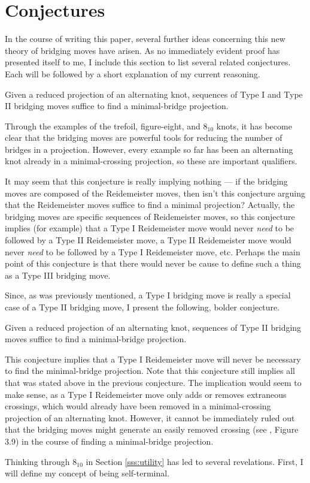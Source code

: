\documentclass[titlepage]{article}
\begin{document}
\section{Conjectures}
In the course of writing this paper, several further ideas concerning this new theory of bridging moves have arisen. As no immediately evident proof has presented itself to me, I include this section to list several related conjectures. Each will be followed by a short explanation of my current reasoning.

\begin{conj}
    Given a reduced projection of an alternating knot, sequences of Type I and Type II bridging moves suffice to find a minimal-bridge projection.
\end{conj}

Through the examples of the trefoil, figure-eight, and $8_{10}$ knots, it has become clear that the bridging moves are powerful tools for reducing the number of bridges in a projection. However, every example so far has been an alternating knot already in a minimal-crossing projection, so these are important qualifiers.\par
It may seem that this conjecture is really implying nothing --- if the bridging moves are composed of the Reidemeister moves, then isn't this conjecture arguing that the Reidemeister moves suffice to find a minimal projection? Actually, the bridging moves are specific sequences of Reidemeister moves, so this conjecture implies (for example) that a Type I Reidemeister move would never \emph{need} to be followed by a Type II Reidemeister move, a Type II Reidemeister move would never \emph{need} to be followed by a Type I Reidemeister move, etc. Perhaps the main point of this conjecture is that there would never be cause to define such a thing as a Type III bridging move.\par
Since, as was previously mentioned, a Type I bridging move is really a special case of a Type II bridging move, I present the following, bolder conjecture.

\begin{conj}
    Given a reduced projection of an alternating knot, sequences of Type II bridging moves suffice to find a minimal-bridge projection.
\end{conj}

This conjecture implies that a Type I Reidemeister move will never be necessary to find the minimal-bridge projection. Note that this conjecture still implies all that was stated above in the previous conjecture. The implication would seem to make sense, as a Type I Reidemeister move only adds or removes extraneous crossings, which would already have been removed in a minimal-crossing projection of an alternating knot. However, it cannot be immediately ruled out that the bridging moves might generate an easily removed crossing (see \cite{bib:knotnotes}, Figure 3.9) in the course of finding a minimal-bridge projection.\par
Thinking through $8_{10}$ in Section \ref{sss:utility} has led to several revelations. First, I will define my concept of being self-terminal.
\end{document}
